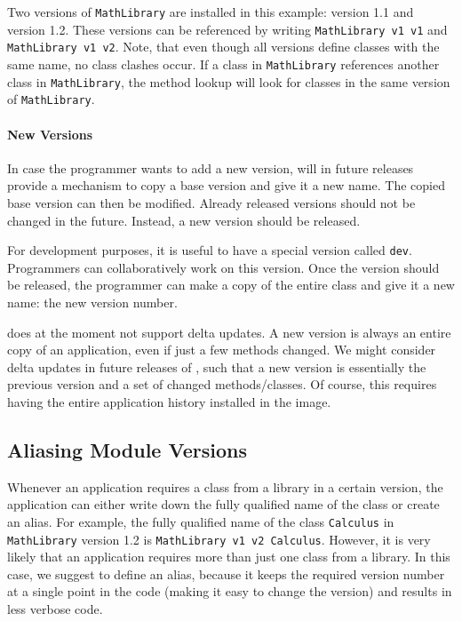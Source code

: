 Two versions of \texttt{MathLibrary} are installed in this example: version 1.1 and version 1.2. These versions can be referenced by writing \texttt{MathLibrary v1 v1} and \texttt{MathLibrary v1 v2}. Note, that even though all versions define classes with the same name, no class clashes occur. If a class in \texttt{MathLibrary} references another class in \texttt{MathLibrary}, the method lookup will look for classes in the same version of \texttt{MathLibrary}.

\paragraph{New Versions}
In case the programmer wants to add a new version, \msname will in future releases provide a mechanism to copy a base version and give it a new name. The copied base version can then be modified. Already released versions should not be changed in the future. Instead, a new version should be released.

For development purposes, it is useful to have a special version called \texttt{dev}. Programmers can collaboratively work on this version. Once the version should be released, the programmer can make a copy of the entire class and give it a new name: the new version number.

\msname does at the moment not support delta updates. A new version is always an entire copy of an application, even if just a few methods changed. We might consider delta updates in future releases of \msname, such that a new version is essentially the previous version and a set of changed methods/classes. Of course, this requires having the entire application history installed in the image.

\subsection{Aliasing Module Versions}
Whenever an application requires a class from a library in a certain version, the application can either write down the fully qualified name of the class or create an alias. For example, the fully qualified name of the class \texttt{Calculus} in \texttt{MathLibrary} version 1.2 is \texttt{MathLibrary v1 v2 Calculus}. However, it is very likely that an application requires more than just one class from a library. In this case, we suggest to define an alias, because it keeps the required version number at a single point in the code (making it easy to change the version) and results in less verbose code.

